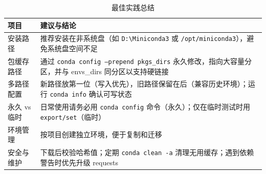 \documentclass[12pt,UTF8]{ctexbook}
\begin{document}
\begin{table}[htbp]
    \centering
    \caption{最佳实践总结}
    \begin{tabular}{|p{4cm}|p{8cm}|}
        \hline
        \textbf{项目} & \textbf{建议与结论} \\
        \hline
        安装路径 & 推荐安装在非系统盘（如 \texttt{D:\textbackslash Miniconda3} 或 \texttt{/opt/miniconda3}），避免系统盘空间不足 \\
        \hline
        包缓存路径 & 通过 \texttt{conda config --prepend pkgs\_dirs} 永久修改，指向大容量分区，并与 envs\_dirs 同分区以支持硬链接 \\
        \hline
        多路径配置 & 新路径放第一位（写入优先），旧路径保留在后（兼容历史环境）；运行 \texttt{conda info} 确认可写状态 \\
        \hline
        永久 vs 临时 & 日常使用请务必用 \texttt{conda config} 命令（永久）；仅在临时测试时用 \texttt{export/set}（临时） \\
        \hline
        环境管理 & 按项目创建独立环境，便于复制和迁移 \\
        \hline
        安全与维护 & 下载后校验哈希值；定期 \texttt{conda clean -a} 清理无用缓存；遇到依赖警告时优先升级 requests \\
        \hline
    \end{tabular}
\end{table}

\backmatter
\end{document}
